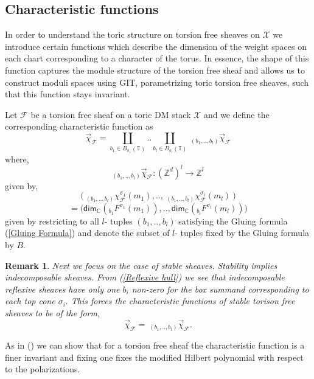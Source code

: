 \documentclass[10pt]{amsart}
\newtheorem{rmk}[prop]{Remark}
\newcommand{\sX}{{\mathcal X}}
\numberwithin{equation}{subsection}
\begin{document}
\subsection{Characteristic functions}\label{Char}
In order to understand the toric structure on torsion free sheaves on $\sX$ we introduce certain functions which describe the dimension of the  weight spaces on each chart corresponding to a character of the torus. In essence, the shape of this function captures the module structure of the torsion free sheaf and allows us to construct moduli spaces using GIT, parametrizing toric torsion free sheaves, such that this function stays invariant. \par  Let $\mathscr{F}$ be a torsion free sheaf on a toric DM stack $\sX$ and we define the corresponding characteristic function as 
$${\vec\chi_{\mathscr{F}}}= \coprod \limits_{b_1\in B_{\sigma_{1}}(\mathbb{T})}..\coprod\limits_{b_l\in B_{\sigma_l}(\mathbb{T})}\ _{(b_1,..,b_l)}\vec \chi_{\mathscr{F}}$$ where,
$$_{(b_1,..,b_l)}\vec\chi_{\mathscr{F}}:(\mathbb{Z}^d)^{l}\to \mathbb{Z}^l$$ given by,
$$\big(\ _{(b_1,..,b_l)}\chi^{\sigma_1}_{\mathscr{F}}(m_1),..,\ _{(b_1,..,b_l)}\chi^{\sigma_l}_{\mathscr{F}}(m_l)\ \big)$$
$$=\big(\mathsf{dim}_{\mathbb{C}}(_{b_1}F^{\sigma_{1}}(m_1)),..,\mathsf{dim}_{\mathbb{C}}(_{b_l}F^{\sigma_l}(m_l))\big)$$ given by restricting to all $l$- tuples $(b_1,..,b_l)$ satisfying the Gluing formula (\ref{Gluing Formula}) and denote the subset of $l$- tuples fixed by the Gluing formula by $B.$\par
\begin{rmk}\label{Stable remark}
Next we focus on the case of stable sheaves. Stability implies indecomposable sheaves. From (\ref{Reflexive hull}) we see that indecomposable reflexive sheaves have only one $b_i$ non-zero for the box summand corresponding to each top cone $\sigma_i.$ This forces the characteristic functions of stable torison free sheaves to be of the form,
$${\vec\chi_{\mathscr{F}}}=\ _{(b_1,..,b_l)}\vec \chi_{\mathscr{F}}.$$
\end{rmk}
As in (\cite{Koo2}) we can show that for a torsion free sheaf the characteristic function is a finer invariant and fixing one fixes the modified Hilbert polynomial with respect to the polarizations.\par
\end{document}
